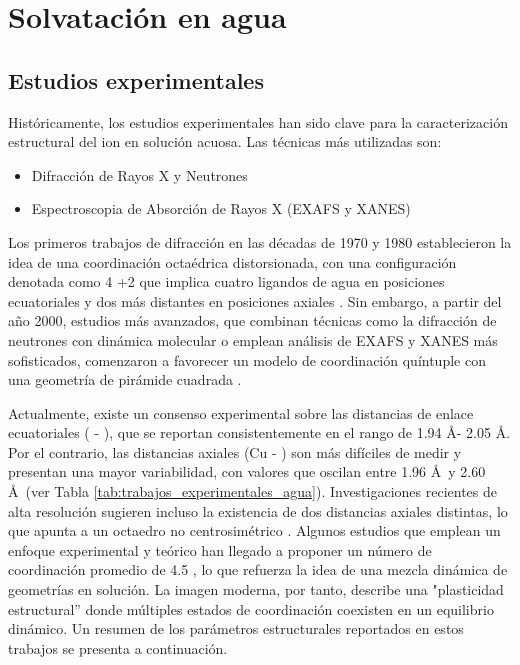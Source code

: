 \section{Solvatación en agua}

    \subsection{Estudios experimentales}

    Históricamente, los estudios experimentales han sido clave para la caracterización estructural del ion  en solución acuosa. Las técnicas más utilizadas son:

    \begin{itemize}
        \item Difracción de Rayos X y Neutrones
        \item Espectroscopia de Absorción de Rayos X (EXAFS y XANES)
    \end{itemize}

    Los primeros trabajos de difracción en las décadas de 1970 y 1980 establecieron la idea de una coordinación octaédrica distorsionada, con una configuración denotada como 4 +2 que implica cuatro ligandos de agua en posiciones ecuatoriales y dos más distantes en posiciones axiales \cite{Wa-1988-01}. Sin embargo, a partir del año 2000, estudios más avanzados, que combinan técnicas como la difracción de neutrones con dinámica molecular o emplean análisis de EXAFS y XANES más sofisticados, comenzaron a favorecer un modelo de coordinación quíntuple con una geometría de pirámide cuadrada \cite{Wa-2001-01, Wa-2002-01}.

    Actualmente, existe un consenso experimental sobre las distancias de enlace ecuatoriales ( - ), que se reportan consistentemente en el rango de 1.94 \AA - 2.05 \AA. Por el contrario, las distancias axiales ({Cu} - ) son más difíciles de medir y presentan una mayor variabilidad, con valores que oscilan entre 1.96 \AA \ y 2.60 \AA\ (ver Tabla \ref{tab:trabajos_experimentales_agua}). Investigaciones recientes de alta resolución sugieren incluso la existencia de dos distancias axiales distintas, lo que apunta a un octaedro no centrosimétrico \cite{Wa-2020-01, Wa-2018-02}. Algunos estudios que emplean un enfoque experimental y teórico han llegado a proponer un número de coordinación promedio de 4.5 \cite{Wa-2013-01}, lo que refuerza la idea de una mezcla dinámica de geometrías en solución. La imagen moderna, por tanto, describe una "plasticidad estructural'' donde múltiples estados de coordinación coexisten en un equilibrio dinámico. Un resumen de los parámetros estructurales reportados en estos trabajos se presenta a continuación.


